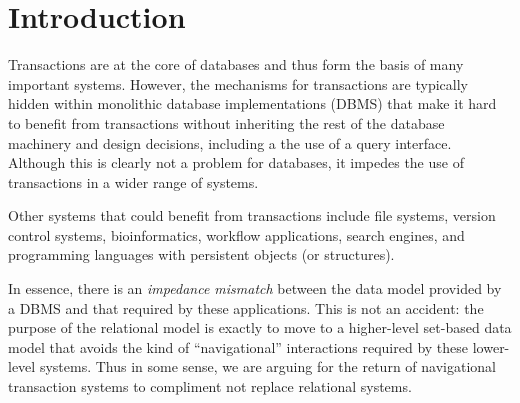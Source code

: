 \documentclass[letterpaper,twocolumn,english]{article}
\begin{document}

\section{Introduction}

Transactions are at the core of databases and thus form the basis of many
important systems. However, the mechanisms for transactions are
typically hidden within monolithic database implementations (DBMS) that make
it hard to benefit from transactions without inheriting the rest of
the database machinery and design decisions, including a the use of a
query interface.  Although this is clearly not a problem for
databases, it impedes the use of transactions in a wider range of
systems.

Other systems that could benefit from transactions include file
systems, version control systems, bioinformatics, workflow
applications, search engines, and programming languages with
persistent objects (or structures).

In essence, there is an {\em impedance mismatch} between the data
model provided by a DBMS and that required by these applications. This is
not an accident: the purpose of the relational model is exactly to
move to a higher-level set-based data model that avoids the kind of
``navigational'' interactions required by these lower-level systems.
Thus in some sense, we are arguing for the return of navigational
transaction systems to compliment not replace relational systems.
\end{document}
